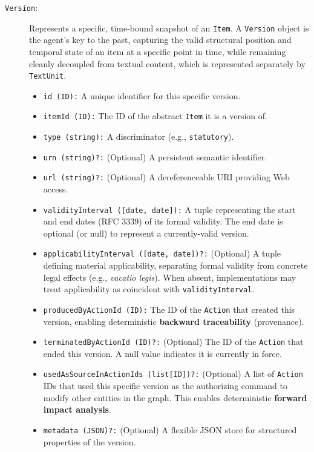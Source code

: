 \documentclass[11pt]{article}
\begin{document}
\begin{description}
    \item[\texttt{Version}:] Represents a specific, time-bound snapshot of an \texttt{Item}. A \texttt{Version} object is the agent's key to the past, capturing the valid structural position and temporal state of an item at a specific point in time, while remaining cleanly decoupled from textual content, which is represented separately by \texttt{TextUnit}.
    \begin{itemize}
        \item \texttt{id (ID):} A unique identifier for this specific version.
        \item \texttt{itemId (ID):} The ID of the abstract \texttt{Item} it is a version of.
        \item \texttt{type (string):} A discriminator (e.g., \texttt{statutory}).
        \item \texttt{urn (string)?:} (Optional) A persistent semantic identifier.
        \item \texttt{url (string)?:} (Optional) A dereferenceable URI providing Web access.
        \item \texttt{validityInterval ([date, date]):} A tuple representing the start and end dates (RFC 3339) of its formal validity. The end date is optional (or null) to represent a currently-valid version.
        \item \texttt{applicabilityInterval ([date, date])?:} (Optional) A tuple defining material applicability, separating formal validity from concrete legal effects (e.g., \textit{vacatio legis}). When absent, implementations may treat applicability as coincident with \texttt{validityInterval}.
        \item \texttt{producedByActionId (ID):} The ID of the \texttt{Action} that created this version, enabling deterministic \textbf{backward traceability} (provenance).
        \item \texttt{terminatedByActionId (ID)?:} (Optional) The ID of the \texttt{Action} that ended this version. A null value indicates it is currently in force.
        \item \texttt{usedAsSourceInActionIds (list[ID])?:} (Optional) A list of \texttt{Action} IDs that used this specific version as the authorizing command to modify other entities in the graph. This enables deterministic \textbf{forward impact analysis}.
        \item \texttt{metadata (JSON)?:} (Optional) A flexible JSON store for structured properties of the version.
    \end{itemize}


\end{description}
\end{document}
